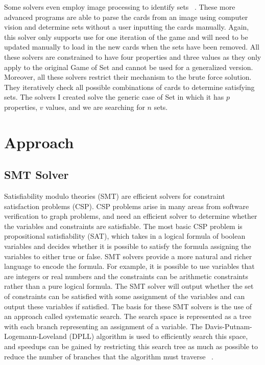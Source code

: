 \documentclass[pageno]{jpaper}
\begin{document}
Some solvers even employ image processing to identify sets ~\cite{jorquera}. These more advanced programs are able to parse the cards from an image using computer vision and determine sets without a user inputting the cards manually. Again, this solver only supports use for one iteration of the game and will need to be updated manually to load in the new cards when the sets have been removed. All these solvers are constrained to have four properties and three values as they only apply to the original Game of Set and cannot be used for a generalized version. Moreover, all these solvers restrict their mechanism to the brute force solution. They iteratively check all possible combinations of cards to determine satisfying sets. The solvers I created solve the generic case of Set in which it has $p$ properties, $v$ values, and we are searching for $n$ sets. 


\section{Approach}

\subsection{SMT Solver}
Satisfiability modulo theories (SMT) are efficient solvers for constraint satisfaction problems (CSP). CSP problems arise in many areas from software verification to graph problems, and need an efficient solver to determine whether the variables and constraints are satisfiable. The most basic CSP problem is propositional satisfiability (SAT), which takes in a logical formula of boolean variables and decides whether it is possible to satisfy the formula assigning the variables to either true or false. SMT solvers provide a more natural and richer language to encode the formula. For example, it is possible to use variables that are integers or real numbers and the constraints can be arithmetic constraints rather than a pure logical formula. The SMT solver will output whether the set of constraints can be satisfied with some assignment of the variables and can output these variables if satisfied. The basis for these SMT solvers is the use of an approach called systematic search. The search space is represented as a tree with each branch representing an assignment of a variable. The Davis-Putnam-Logemann-Loveland (DPLL) algorithm is used to efficiently search this space, and speedups can be gained by restricting this search tree as much as possible to reduce the number of branches that the algorithm must traverse ~\cite{SMTbackground}.
\end{document}
